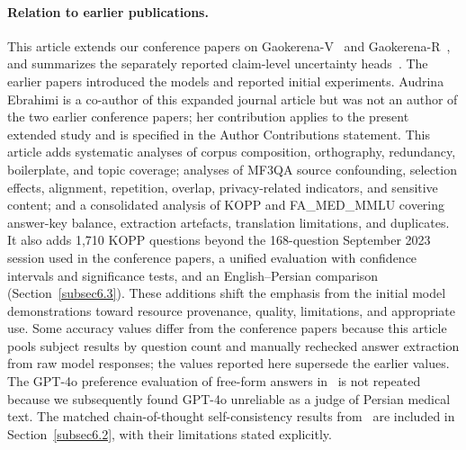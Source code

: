 \documentclass[manuscript,screen,review]{acmart}
\begin{document}
\paragraph{Relation to earlier publications.} This article extends our conference papers on Gaokerena-V~\cite{b1} and Gaokerena-R~\cite{b2}, and summarizes the separately reported claim-level uncertainty heads~\cite{b3}. The earlier papers introduced the models and reported initial experiments. Audrina Ebrahimi is a co-author of this expanded journal article but was not an author of the two earlier conference papers; her contribution applies to the present extended study and is specified in the Author Contributions statement. This article adds systematic analyses of corpus composition, orthography, redundancy, boilerplate, and topic coverage; analyses of MF3QA source confounding, selection effects, alignment, repetition, overlap, privacy-related indicators, and sensitive content; and a consolidated analysis of KOPP and FA\_MED\_MMLU covering answer-key balance, extraction artefacts, translation limitations, and duplicates. It also adds 1,710 KOPP questions beyond the 168-question September 2023 session used in the conference papers, a unified evaluation with confidence intervals and significance tests, and an English--Persian comparison (Section~\ref{subsec6.3}). These additions shift the emphasis from the initial model demonstrations toward resource provenance, quality, limitations, and appropriate use. Some accuracy values differ from the conference papers because this article pools subject results by question count and manually rechecked answer extraction from raw model responses; the values reported here supersede the earlier values. The GPT-4o preference evaluation of free-form answers in~\cite{b1} is not repeated because we subsequently found GPT-4o unreliable as a judge of Persian medical text. The matched chain-of-thought self-consistency results from~\cite{b2} are included in Section~\ref{subsec6.2}, with their limitations stated explicitly.
\end{document}
